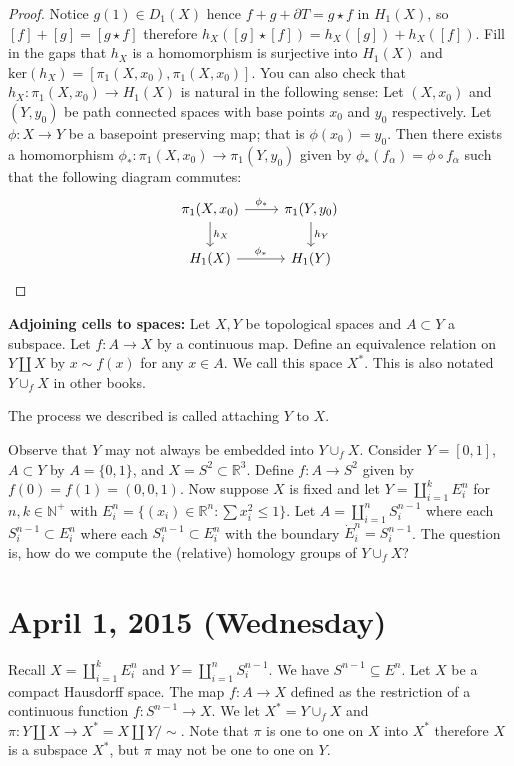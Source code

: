 \documentclass{article}
\begin{document}
\begin{proof}
Notice $g(1) \in D_1(X)$ hence $f + g + \partial T = g \star f$ in $H_1(X)$, so $[f] + [g] = [g \star f]$ therefore $h_X([g] \star [f]) = h_X([g]) + h_X([f])$. Fill in the gaps that $h_X$ is a homomorphism is surjective into $H_1(X)$ and $\text{ker}(h_X) = [\pi_1(X,x_0), \pi_1(X,x_0)]$. You can also check that $h_X: \pi_1(X, x_0) \to H_1(X)$ is natural in the following sense: Let 
$(X, x_0)$ and $(Y,y_0)$ be path connected spaces with base points $x_0$ and $y_0$ respectively. Let $\phi: X \to Y$ be a basepoint preserving map; that is $\phi(x_0) = y_0$. Then there exists a homomorphism $\phi_*:\pi_1(X, x_0) \to \pi_1(Y, y_0)$ given by $\phi_*(f_\alpha) = \phi \circ f_\alpha$ such that the following diagram commutes:
\[
\begin{tikzcd}
\pi_1(X, x_0) \arrow[r, "\phi_*"] \arrow[d, "h_X"] & \pi_1(Y, y_0) \arrow[d, "h_Y"] \\
H_1(X) \arrow[r, "\phi_*"] & H_1(Y)
\end{tikzcd}
\]
\end{proof}

\textbf{Adjoining cells to spaces:} Let $X,Y$ be topological spaces and $A \subset Y$ a subspace. Let $f: A \to X$ by a continuous map. Define an equivalence relation on $Y \coprod X$ by $x \sim f(x)$ for any $x \in A$. We call this space $X^*$. This is also notated $Y \cup_f X$ in other books.

The process we described is called attaching $Y$ to $X$.

Observe that $Y$ may not always be embedded into $Y \cup_f X$. Consider $Y = [0,1]$, $A \subset Y$ by $A = \{ 0, 1 \}$, and $X = S^2 \subset \mathbb{R}^3$. Define $f: A \to S^2$ given by $f(0) = f(1) = (0,0,1)$. Now suppose $X$ is fixed and let $Y = \coprod_{i = 1}^k E_i^n$ for $n,k \in \mathbb{N}^+$ with $E_i^n = \{ (x_i) \in \mathbb{R}^n : \sum x_i^2 \leq 1 \}$. Let $A = \coprod_{i = 1}^n S_i^{n-1}$ where each $S_i^{n-1} \subset E_i^n$ where each $S_{i}^{n-1} \subset E_i^n$ with the boundary $\dot{E}_i^n = S^{n-1}_i$. The question is, how do we compute the (relative) homology groups of $Y \cup_f X$? 

\section{April 1, 2015 (Wednesday)}
Recall $X = \coprod_{i = 1}^k E_i^n$ and $Y = \coprod_{i = 1}^n S_i^{n-1}$. We have $S^{n-1} \subseteq E^n$. Let $X$ be a compact Hausdorff space. The map $f:A \to X$ defined as the restriction of a continuous function $f:S^{n-1} \to X$. We let $X^* = Y \cup_f X$ and $\pi: Y \coprod X \to X^* = X \coprod Y / \sim$. Note that $\pi$ is one to one on $X$ into $X^*$ therefore $X$ is a subspace $X^*$, but $\pi$ may not be one to one on $Y$.
\end{document}
